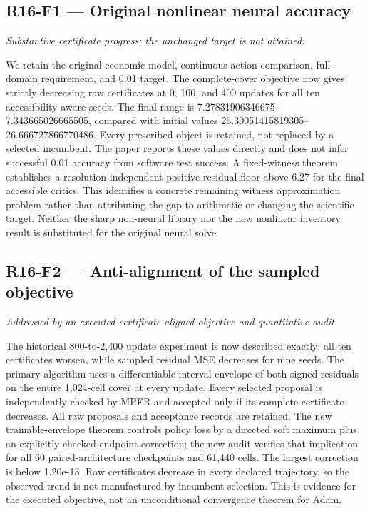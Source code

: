 \documentclass[ecta]{econsocart}
\theoremstyle{remark}
\begin{document}
\subsection{R16-F1 --- Original nonlinear neural accuracy}
\noindent\emph{Substantive certificate progress; the unchanged target is not attained.}

We retain the original economic model, continuous action comparison, full-domain requirement, and 0.01 target. The complete-cover objective now gives strictly decreasing raw certificates at 0, 100, and 400 updates for all ten accessibility-aware seeds. The final range is 7.27831906346675--7.343665026665505, compared with initial values 26.30051415819305--26.666727866770486. Every prescribed object is retained, not replaced by a selected incumbent. The paper reports these values directly and does not infer successful 0.01 accuracy from software test success. A fixed-witness theorem establishes a resolution-independent positive-residual floor above 6.27 for the final accessible critics. This identifies a concrete remaining witness approximation problem rather than attributing the gap to arithmetic or changing the scientific target. Neither the sharp non-neural library nor the new nonlinear inventory result is substituted for the original neural solve.

\subsection{R16-F2 --- Anti-alignment of the sampled objective}
\noindent\emph{Addressed by an executed certificate-aligned objective and quantitative audit.}

The historical 800-to-2,400 update experiment is now described exactly: all ten certificates worsen, while sampled residual MSE decreases for nine seeds. The primary algorithm uses a differentiable interval envelope of both signed residuals on the entire 1,024-cell cover at every update. Every selected proposal is independently checked by MPFR and accepted only if its complete certificate decreases. All raw proposals and acceptance records are retained. The new trainable-envelope theorem controls policy loss by a directed soft maximum plus an explicitly checked endpoint correction; the new audit verifies that implication for all 60 paired-architecture checkpoints and 61,440 cells. The largest correction is below 1.20e-13. Raw certificates decrease in every declared trajectory, so the observed trend is not manufactured by incumbent selection. This is evidence for the executed objective, not an unconditional convergence theorem for Adam.
\end{document}
